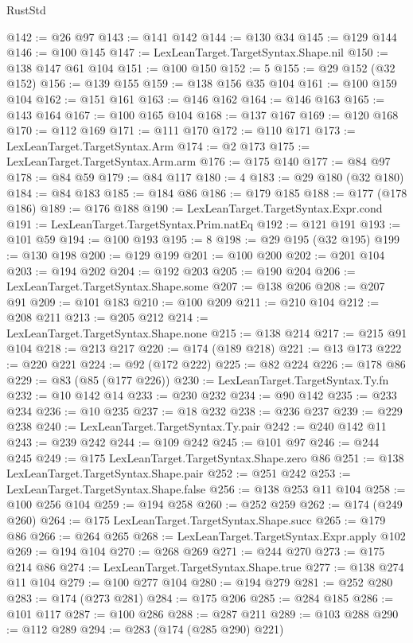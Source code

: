 \begin{lexlean}{RustStd}
\begin{coremodule}
{\begin{coremodule}
{{{{{{{{{{{{{{{{{{{{{{{{{{{{{{{{{{{{{{{{{{{{{{{{{{{{{{{@142 := @26 @97
@143 := @141 @142
@144 := @130 @34
@145 := @129 @144
@146 := @100 @145
@147 := LexLeanTarget.TargetSyntax.Shape.nil
@150 := @138 @147 @61 @104
@151 := @100 @150
@152 := 5
@155 := @29 @152 (@32 @152)
@156 := @139 @155
@159 := @138 @156 @35 @104
@161 := @100 @159 @104
@162 := @151 @161
@163 := @146 @162
@164 := @146 @163
@165 := @143 @164
@167 := @100 @165 @104
@168 := @137 @167
@169 := @120 @168
@170 := @112 @169
@171 := @111 @170
@172 := @110 @171
@173 := LexLeanTarget.TargetSyntax.Arm
@174 := @2 @173
@175 := LexLeanTarget.TargetSyntax.Arm.arm
@176 := @175 @140
@177 := @84 @97
@178 := @84 @59
@179 := @84 @117
@180 := 4
@183 := @29 @180 (@32 @180)
@184 := @84 @183
@185 := @184 @86
@186 := @179 @185
@188 := @177 (@178 @186)
@189 := @176 @188
@190 := LexLeanTarget.TargetSyntax.Expr.cond
@191 := LexLeanTarget.TargetSyntax.Prim.natEq
@192 := @121 @191
@193 := @101 @59
@194 := @100 @193
@195 := 8
@198 := @29 @195 (@32 @195)
@199 := @130 @198
@200 := @129 @199
@201 := @100 @200
@202 := @201 @104
@203 := @194 @202
@204 := @192 @203
@205 := @190 @204
@206 := LexLeanTarget.TargetSyntax.Shape.some
@207 := @138 @206
@208 := @207 @91
@209 := @101 @183
@210 := @100 @209
@211 := @210 @104
@212 := @208 @211
@213 := @205 @212
@214 := LexLeanTarget.TargetSyntax.Shape.none
@215 := @138 @214
@217 := @215 @91 @104
@218 := @213 @217
@220 := @174 (@189 @218)
@221 := @13 @173
@222 := @220 @221
@224 := @92 (@172 @222)
@225 := @82 @224
@226 := @178 @86
@229 := @83 (@85 (@177 @226))
@230 := LexLeanTarget.TargetSyntax.Ty.fn
@232 := @10 @142 @14
@233 := @230 @232
@234 := @90 @142
@235 := @233 @234
@236 := @10 @235
@237 := @18 @232
@238 := @236 @237
@239 := @229 @238
@240 := LexLeanTarget.TargetSyntax.Ty.pair
@242 := @240 @142 @11
@243 := @239 @242
@244 := @109 @242
@245 := @101 @97
@246 := @244 @245
@249 := @175 LexLeanTarget.TargetSyntax.Shape.zero @86
@251 := @138 LexLeanTarget.TargetSyntax.Shape.pair
@252 := @251 @242
@253 := LexLeanTarget.TargetSyntax.Shape.false
@256 := @138 @253 @11 @104
@258 := @100 @256 @104
@259 := @194 @258
@260 := @252 @259
@262 := @174 (@249 @260)
@264 := @175 LexLeanTarget.TargetSyntax.Shape.succ
@265 := @179 @86
@266 := @264 @265
@268 := LexLeanTarget.TargetSyntax.Expr.apply @102
@269 := @194 @104
@270 := @268 @269
@271 := @244 @270
@273 := @175 @214 @86
@274 := LexLeanTarget.TargetSyntax.Shape.true
@277 := @138 @274 @11 @104
@279 := @100 @277 @104
@280 := @194 @279
@281 := @252 @280
@283 := @174 (@273 @281)
@284 := @175 @206
@285 := @284 @185
@286 := @101 @117
@287 := @100 @286
@288 := @287 @211
@289 := @103 @288
@290 := @112 @289
@294 := @283 (@174 (@285 @290) @221)
}}}}}}}}}}}}}}}}}}}}}}}}}}}}}}}}}}}}}}}}}}}}}}}}}}}}}}}
\end{coremodule}}
\end{coremodule}
\end{lexlean}
